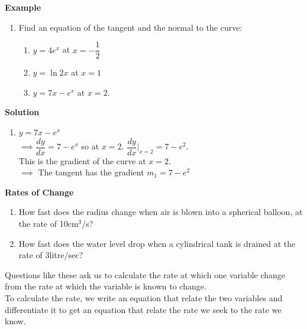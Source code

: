 \documentclass[11pt,a4paper]{article}
\begin{document}
\textbf{Example}
\begin{enumerate}
\item Find an equation of the tangent and the normal to the curve:
\begin{enumerate}
       \item $y=4e^{\displaystyle{x}}$ at $x=-\dfrac{1}{2}$
       \item $y=\ln 2x$ at $x=1$
       \item $y=7x-e^{\displaystyle{x}}$ at $x=2$.\\
\end{enumerate}
\end{enumerate}


\textbf{Solution}
\begin{enumerate}
\item[1.(c)] $y=7x-e^{\displaystyle{x}}$\\

$\implies \dfrac{dy}{dx}=7-e^{\displaystyle{x}}$ so at $x=2$. $\dfrac{dy}{dx}\Bigg|_{x=2}=7-e^2$.\\
This is the gradient of the curve at $x=2$.\\

$\implies$ The tangent has the gradient $m_1=7-e^2$


\begin{figure}[H]
\centering
{}
\end{figure}
\end{enumerate}
\vspace{0.5cm}








\textbf{Rates of Change}
\begin{enumerate}
\item How fast does the radius change when air is blown into a spherical balloon, at the rate of 10cm$^3/$s?
\item How fast does the water level drop when a cylindrical tank is drained at the rate of 3litre/sec?\\
\end{enumerate}

Questions like these ask us to calculate the rate at which one variable change from the rate at which the variable is known to change.\\
To calculate the rate, we write an equation that relate the two variables and differentiate it to get an equation that relate the rate we seek to the rate we know.\\
\end{document}
